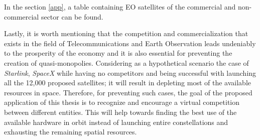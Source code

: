 \begin{center}
\begin{adjustbox}{width=0.9\textwidth}
\begin{tabular}{||c| c |c |c |c||}


\hline
\end{tabular}
\label{table:EO}
\end{adjustbox}
\end{center}
\bigskip

\normalsize

In the section \ref{app}, a table containing EO satellites of the commercial and non-commercial sector can be found.

Lastly, it is worth mentioning that the competition and commercialization that exists in the field of Telecommunications and Earth Observation leads undeniably to the prosperity of the economy and it is also essential for preventing the creation of quasi-monopolies. Considering as a hypothetical scenario the case of \textit{Starlink}, \textit{SpaceX} while having no competitors and being successful with launching all the 12,000 proposed satellites; it will result in depleting most of the available resources in space. Therefore, for preventing such cases, the goal of the proposed application of this thesis is to recognize and encourage a virtual competition between different entities. This will help towards finding the best use of the available hardware in orbit instead of launching entire constellations and exhausting the remaining spatial resources.


